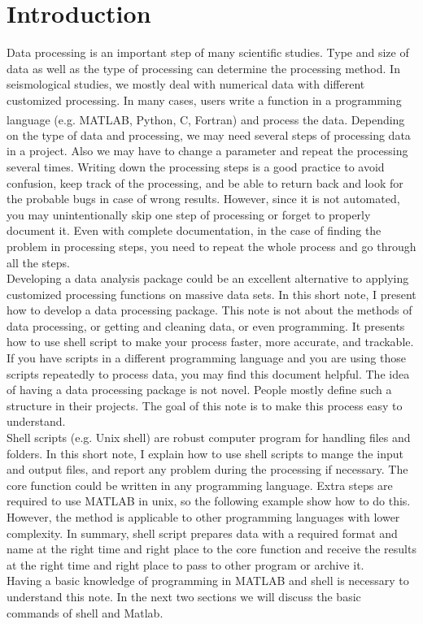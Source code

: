 \section{Introduction}
Data processing is an important step of many scientific studies. Type and size of data as well as the type of processing can determine the processing method. In seismological studies, we mostly deal with numerical data with different customized processing. In many cases, users write a function in a programming language (e.g. MATLAB\textsuperscript{\textregistered}, Python, C, Fortran) and process the data. Depending on the type of data and processing, we may need several steps of processing data in a project. Also we may have to change a parameter and repeat the processing several times.  Writing down the processing steps is a good practice to avoid confusion, keep track of the processing, and be able to return back and look for the probable bugs in case of wrong results. However, since it is not automated, you may unintentionally skip one step of processing or forget to properly document it. Even with complete documentation, in the case of finding the problem in processing steps, you need to repeat the whole process and go through all the steps. \\
Developing a data analysis package could be an excellent alternative to applying customized processing functions on massive data sets. In this short note, I present how to develop a data processing package. This note is not about the methods of data processing, or getting and cleaning data, or even programming. It presents how to use shell script to make your process faster, more accurate, and trackable. If you have  scripts in a different programming language and you are using those scripts repeatedly to process data, you may find this document helpful. The idea of having a data processing package is not novel. People mostly define such a structure in their projects. The goal of this note is to make this process easy to understand.\\
 Shell scripts (e.g. Unix shell) are robust computer program for handling files and folders. In this short note, I explain how to use shell scripts to mange the input and output files, and report any problem during the processing if necessary. The core function could be written in any programming language. Extra steps are required to use MATLAB in unix, so the following example show how to do this. However, the method is applicable to other programming languages with lower complexity. In summary, shell script prepares  data with a required format and name at the right time and right place to the core function and receive the results at the right time and right place to pass to other program or archive it.\\
Having a basic knowledge of programming in MATLAB and shell is necessary to understand this note. In the next two sections we will discuss the basic commands of shell and Matlab. 

